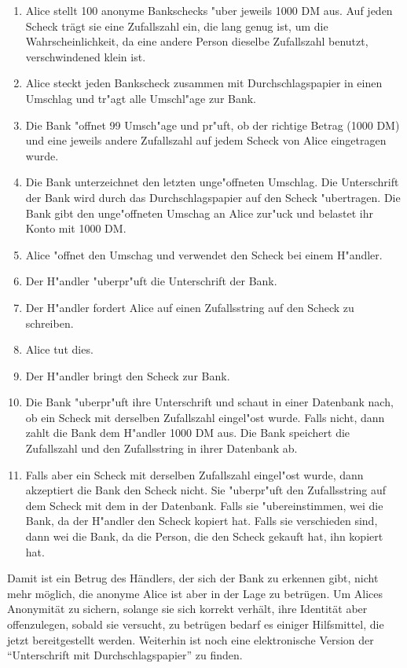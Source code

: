 \begin{enumerate}
  \item Alice stellt 100 anonyme Bankschecks "uber jeweils 1000 DM
        aus. Auf jeden Scheck tr\"agt sie eine Zufallszahl ein, die lang
        genug ist, um die Wahrscheinlichkeit, da\3 eine andere Person
        dieselbe Zufallszahl benutzt, verschwindened klein ist.
  \item Alice steckt jeden Bankscheck zusammen mit Durchschlagspapier
        in einen Umschlag und tr"agt alle Umschl"age zur Bank.
  \item Die Bank "offnet 99 Umsch"age und pr"uft, ob der richtige
        Betrag (1000 DM) und eine jeweils andere Zufallszahl auf jedem
        Scheck von Alice eingetragen wurde.
  \item Die Bank unterzeichnet den letzten unge"offneten Umschlag. Die
        Unterschrift der Bank wird durch das Durchschlagspapier auf
        den Scheck "ubertragen.  Die Bank gibt den unge"offneten
        Umschag an Alice zur"uck und belastet ihr Konto mit 1000 DM.
  \item Alice "offnet den Umschag und verwendet den Scheck bei einem
        H"andler.
  \item Der H"andler "uberpr"uft die Unterschrift der Bank.
  \item Der H"andler fordert Alice auf einen Zufallsstring auf den
        Scheck zu schreiben.
  \item Alice tut dies.
  \item Der H"andler bringt den Scheck zur Bank.
  \item Die Bank "uberpr"uft ihre Unterschrift und schaut in einer
        Datenbank nach, ob ein Scheck mit derselben Zufallszahl
        eingel"ost wurde. Falls nicht, dann zahlt die Bank dem
        H"andler 1000 DM aus. Die Bank speichert die Zufallszahl und den
        Zufallsstring in ihrer Datenbank ab.
  \item Falls aber ein Scheck mit derselben Zufallszahl eingel"ost
        wurde, dann akzeptiert die Bank den Scheck nicht. Sie
        "uberpr"uft den Zufallsstring auf dem Scheck mit dem in der
        Datenbank. Falls sie "ubereinstimmen, wei\3 die Bank, da\3 der
        H"andler den Scheck kopiert hat. Falls sie verschieden sind,
        dann wei\3 die Bank, da\3 die Person, die den Scheck gekauft
        hat, ihn kopiert hat.
\end{enumerate}

Damit ist ein Betrug des H\"andlers, der sich der Bank zu erkennen
gibt, nicht mehr m\"oglich, die anonyme Alice ist aber in der Lage zu
betr\"ugen.
Um Alices Anonymit\"at zu sichern, solange sie sich korrekt verh\"alt,
ihre Identit\"at aber offenzulegen, sobald sie versucht, zu betr\"ugen
bedarf es einiger Hilfsmittel, die jetzt bereitgestellt werden. Weiterhin
ist noch eine elektronische Version der "`Unterschrift mit
Durchschlagspapier"' zu finden.

